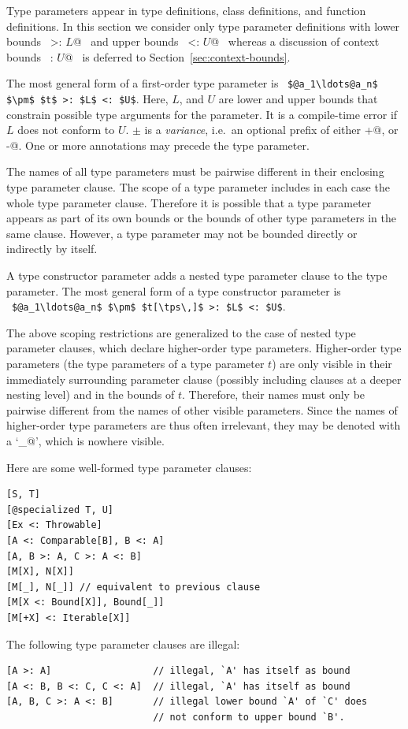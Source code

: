 Type parameters appear in type definitions, class definitions, and
function definitions.  In this section we consider only type parameter
definitions with lower bounds ~\lstinline@>: $L$@~ and upper bounds
~\lstinline@<: $U$@~ whereas a discussion of context bounds
~\lstinline@: $U$@~ is deferred to Section~\ref{sec:context-bounds}.

The most general form of a first-order type parameter is
~\lstinline!$@a_1\ldots@a_n$ $\pm$ $t$ >: $L$ <: $U$!.  
Here, $L$, and $U$ are lower and upper bounds that
constrain possible type arguments for the parameter.  It is a
compile-time error if $L$ does not conform to $U$. $\pm$ is a {\em
variance}, i.e.\ an optional prefix of either \lstinline@+@, or
\lstinline@-@. One or more annotations may precede the type parameter.


The names of all type parameters must be pairwise different in their enclosing type parameter clause.  The scope of a type parameter includes in each case the whole type parameter clause. Therefore it is possible that a type parameter appears as part of its own bounds or the bounds of other type parameters in the same clause.  However, a type parameter may not be bounded directly or indirectly by itself.\

A type constructor parameter adds a nested type parameter clause to the type parameter. The most general form of a type constructor parameter is ~\lstinline!$@a_1\ldots@a_n$ $\pm$ $t[\tps\,]$ >: $L$ <: $U$!.  

The above scoping restrictions are generalized to the case of nested type parameter clauses, which declare higher-order type parameters. Higher-order type parameters (the type parameters of a type parameter $t$) are only visible in their immediately surrounding parameter clause (possibly including clauses at a deeper nesting level) and in the bounds of $t$. Therefore, their names must only be pairwise different from the names of other visible parameters. Since the names of higher-order type parameters are thus often irrelevant, they may be denoted with a `\lstinline@_@', which is nowhere visible.

\example Here are some well-formed type parameter clauses:
\begin{lstlisting}
[S, T]
[@specialized T, U]
[Ex <: Throwable]
[A <: Comparable[B], B <: A]
[A, B >: A, C >: A <: B]
[M[X], N[X]]
[M[_], N[_]] // equivalent to previous clause
[M[X <: Bound[X]], Bound[_]]
[M[+X] <: Iterable[X]]
\end{lstlisting}
The following type parameter clauses are illegal:
\begin{lstlisting}
[A >: A]                  // illegal, `A' has itself as bound
[A <: B, B <: C, C <: A]  // illegal, `A' has itself as bound
[A, B, C >: A <: B]       // illegal lower bound `A' of `C' does
                          // not conform to upper bound `B'.
\end{lstlisting}

